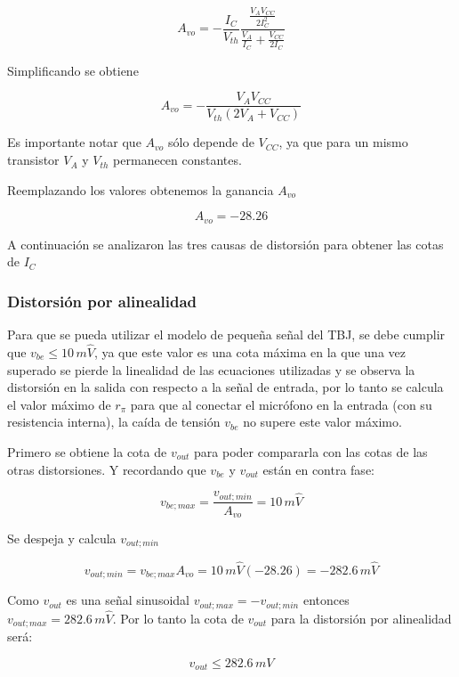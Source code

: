 \documentclass[10pt,spanish,a4paper,openany,notitlepage]{article}
\begin{document}
\[ \displaystyle A_{vo} = -\frac{I_C}{V_{th}} \frac{\frac{V_A V_{CC}}{2 I_C^2}}{\frac{V_A}{I_C} + \frac{V_{CC}}{2 I_C}} \]

Simplificando se obtiene

\begin{equation}
\displaystyle A_{vo} = -\frac{V_A V_{CC}}{V_{th} (2 V_A + V_{CC})}
\label{eq:Avo}
\end{equation}

Es importante notar que $A_{vo}$ sólo depende de $V_{CC}$, ya que
para un mismo transistor $V_A$ y $V_{th}$ permanecen constantes.

Reemplazando los valores obtenemos la ganancia $A_{vo}$

\[ \displaystyle A_{vo} = -28.26 \]

A continuación se analizaron las tres causas de distorsión para obtener las
cotas de $I_C$

\subsubsection{Distorsión por alinealidad}

Para que se pueda utilizar el modelo de pequeña señal del TBJ, se
debe cumplir que $v_{be} \leqslant 10\,\unit{m\widehat{V}}$, ya que este valor es una 
cota máxima en la que una vez superado se pierde la linealidad de las 
ecuaciones utilizadas y se observa la distorsión en la salida con 
respecto a la señal de entrada, por lo tanto se calcula el valor  
máximo de $r_{\pi}$ para que al conectar el micrófono en la entrada 
(con su resistencia interna), la caída de tensión $v_{be}$ no supere este valor 
máximo.

Primero se obtiene la cota de $v_{out}$ para poder compararla con las
cotas de las otras distorsiones. Y recordando que $v_{be}$ y $v_{out}$
están en contra fase:

\[ \displaystyle v_{be;max} = \frac{v_{out;min}}{A_{vo}} = 10\,\unit{m\widehat{V}}\]

Se despeja y calcula $v_{out;min}$

\[ \displaystyle v_{out;min} = v_{be;max} A_{vo} = 10\,\unit{m\widehat{V}} (-28.26) = -282.6 \,\unit{m\widehat{V}}\]

Como $v_{out}$ es una señal sinusoidal $v_{out;max} = -v_{out;min}$ entonces
$v_{out;max} = 282.6 \,\unit{m\widehat{V}}$. 
Por lo tanto la cota de $v_{out}$ para la distorsión por alinealidad será:

\begin{equation}
v_{out} \leqslant 282.6\, \unit{mV}
\label{eq:vout_alinealidad}
\end{equation}
\end{document}
